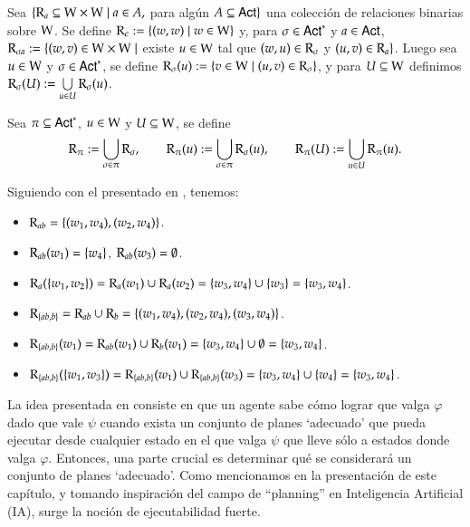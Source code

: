 \begin{definicion}
    Sea $\{\mathrm{R}_a \subseteq \mathrm{W} \times \mathrm{W} \mid a \in A,$ para algún $A \subseteq {\rm \sf Act} \}$ una colección de relaciones binarias sobre $\mathrm{W}$. 
    Se define $\mathrm{R}_\epsilon := \{(w,w) \mid w \in \mathrm{W}\}$ y, para $\sigma \in {\rm \sf Act}^*$ y $a \in {\rm \sf Act}$, 
    $\mathrm{R}_{\sigma a} := \{(w,v) \in \mathrm{W} \times \mathrm{W} \mid$ existe $u \in \mathrm{W}$ tal que $(w,u) \in \mathrm{R}_\sigma$ y $(u,v) \in \mathrm{R}_a \}$. 
    Luego sea $u \in \mathrm{W}$ y $\sigma \in {\rm \sf Act}^*$, se define $\mathrm{R}_\sigma(u) := \{v\in\mathrm{W} \mid (u,v) \in \mathrm{R}_\sigma\}$, y para $U\subseteq\mathrm{W}$ 
    definimos $\mathrm{R}_\sigma(U) := \bigcup\limits_{u \in U} \mathrm{R}_\sigma(u)$.

    Sea $\pi \subseteq {\rm \sf Act}^*$, $u \in \mathrm{W}$ y $U \subseteq \mathrm{W}$, se define
    \[
        \mathrm{R}_\uppi := \bigcup_{\sigma \in \uppi} \mathrm{R}_{\sigma},
    \qquad
        \mathrm{R}_{\uppi}(u) := \bigcup_{\sigma \in \uppi} \mathrm{R}_\sigma(u),
    \qquad
        \mathrm{R}_{\uppi}(U) := \bigcup_{u \in U} \mathrm{R}_{\uppi}(u).
    \]
\end{definicion}

\begin{ejemplo}
    Siguiendo con el \ults presentado en , tenemos:
    \begin{itemize}
        \item $\mathrm{R}_{ab} = \{(w_1,w_4), (w_2, w_4)\}$.
        \item $\mathrm{R}_{ab}(w_1) = \{w_4\}$, \quad $\mathrm{R}_{ab}(w_3) = \emptyset$. 
        \item $\mathrm{R}_{a}(\{w_1,w_2\}) = \mathrm{R}_a(w_1) \cup \mathrm{R}_a(w_2) = \{w_3,w_4\} \cup \{w_3\} = \{w_3, w_4\}$.
        \item $\mathrm{R}_{\{ab,b\}} = \mathrm{R}_{ab} \cup \mathrm{R}_b = \{(w_1,w_4),(w_2,w_4),(w_3,w_4)\}$.
        \item $\mathrm{R}_{\{ab,b\}}(w_1) = \mathrm{R}_{ab}(w_1) \cup \mathrm{R}_b(w_1) = \{w_3,w_4\} \cup \emptyset = \{w_3,w_4\}$.
        \item $\mathrm{R}_{\{ab,b\}}(\{w_1,w_3\}) = \mathrm{R}_{\{ab,b\}}(w_1) \cup \mathrm{R}_{\{ab,b\}}(w_3) = \{w_3,w_4\} \cup \{w_4\} = \{w_3,w_4\}$.
    \end{itemize}
\end{ejemplo}


La idea presentada en \cite{ArecesFSV25,SaraviaPHD} consiste en que un agente sabe cómo lograr que valga $\varphi$ dado que vale $\psi$ cuando exista un 
conjunto de planes `adecuado' que pueda ejecutar desde cualquier estado en el que valga $\psi$ que lleve sólo a estados donde valga $\varphi$. 
Entonces, una parte crucial es determinar qué se considerará un conjunto de planes `adecuado'. Como mencionamos en la presentación de este capítulo, y tomando 
inspiración del campo de ``planning'' en Inteligencia Artificial (IA), surge la noción de ejecutabilidad fuerte.

